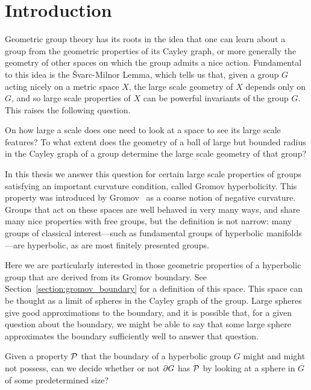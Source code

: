 \chapter{Introduction}

Geometric group theory has its roots in the idea that one can learn about a group from the geometric properties of its Cayley graph, or more generally the geometry of other spaces on which the group admits a nice action.
Fundamental to this idea is the \v{S}varc-Milnor Lemma, which tells us that, given a group $G$ acting nicely on a metric space $X$, the large scale geometry of $X$ depends only on $G$, and so large scale properties of $X$ can be powerful invariants of the group $G$.
This raises the following question.

\begin{question}\label{question:large_scale_features}
  On how large a scale does one need to look at a space to see its large scale features?
  To what extent does the geometry of a ball of large but bounded radius in the Cayley graph of a group determine the large scale geometry of that group?
\end{question}

In this thesis we answer this question for certain large scale properties of groups satisfying an important curvature condition, called Gromov hyperbolicity.
This property was introduced by Gromov~\cite{gromov87} as a coarse notion of negative curvature.
Groups that act on these spaces are well behaved in very many ways, and share many nice properties with free groups, but the definition is not narrow: many groups of classical interest---such as fundamental groups of hyperbolic manifolds---are hyperbolic, as are most finitely presented groups.

Here we are particularly interested in those geometric properties of a hyperbolic group that are derived from its Gromov boundary.
See Section~\ref{section:gromov_boundary} for a definition of this space.
This space can be thought as a limit of spheres in the Cayley graph of the group.
Large spheres give good approximations to the boundary, and it is possible that, for a given question about the boundary, we might be able to say that some large sphere approximates the boundary sufficiently well to answer that question.

\begin{question}\label{question:boundary}
  Given a property $\mathcal{P}$ that the boundary of a hyperbolic group $G$ might and might not possess, can we decide whether or not $\partial G$ has $\mathcal{P}$ by looking at a sphere in $G$ of some predetermined size?
\end{question}

